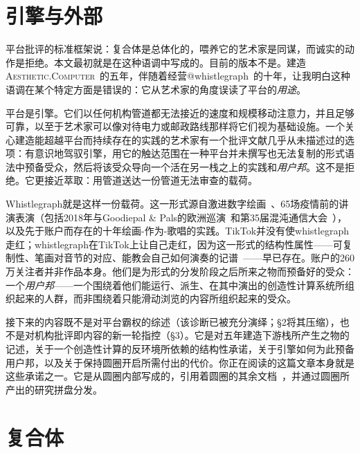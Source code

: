\documentclass[10pt,letterpaper,twocolumn]{article}
\newcommand{\ac}{\textsc{Aesthetic.Computer}}
\begin{document}
\section{引擎与外部}

平台批评的标准框架说：复合体是总体化的，喂养它的艺术家是同谋，而诚实的动作是拒绝。本文最初就是在这种语调中写成的。目前的版本不是。建造\ac{}~\citep{scudder2026ac}的五年，伴随着经营@whistlegraph~\citep{scudder2026whistlegraph}的十年，让我明白这种语调在某个特定方面是错误的：它从艺术家的角度误读了平台的\emph{用途}。

平台是引擎。它们以任何机构管道都无法接近的速度和规模移动注意力，并且足够可靠，以至于艺术家可以像对待电力或邮政路线那样将它们视为基础设施。一个关心建造能超越平台而持续存在的实践的艺术家有一个批评文献几乎从未描述过的选项：有意识地驾驭引擎，用它的触达范围在一种平台并未撰写也无法复制的形式语法中预备受众，然后将该受众导向一个活在另一栈之上的实践和\emph{用户邦}。这不是拒绝。它更接近萃取：用管道送达一份管道无法审查的载荷。

Whistlegraph就是这样一份载荷。这一形式源自激进数字绘画~\citep{scudder2026whistlegraph, scudder2017manifesto}、65场疫情前的讲演表演（包括2018年与Goodiepal \& Pals的欧洲巡演~\citep{scudder2026goodiepal}和第35届混沌通信大会~\citep{scudder2018rdp35c3}），以及先于账户而存在的十年绘画-作为-歌唱的实践。TikTok并没有使whistlegraph走红；whistlegraph在TikTok上让自己走红，因为这一形式的结构性属性——可复制性、笔画对音节的对应、能教会自己如何演奏的记谱~\citep{scudder2026whistlegraph}——早已存在。账户的260万关注者并非作品本身。他们是为形式的分发阶段之后所来之物而预备好的受众：一个\emph{用户邦}——一个围绕着他们能运行、派生、在其中演出的创造性计算系统所组织起来的人群，而非围绕着只能滑动浏览的内容所组织起来的受众。

接下来的内容既不是对平台霸权的综述（该诊断已被充分演绎；\S2将其压缩），也不是对机构批评即内容的新一轮指控（\S3）。它是对五年建造下游栈所产生之物的记述，关于一个创造性计算的反环境所依赖的结构性承诺，关于引擎如何为此预备用户邦，以及关于保持圆圈开启所需付出的代价。你正在阅读的这篇文章本身就是这些承诺之一。它是从圆圈内部写成的，引用着圆圈的其余文档~\citep{scudder2026ac, scudder2026kidlisp, scudder2026notepat, scudder2026os, scudder2026pieces, scudder2026urltradition, scudder2026archaeology, scudder2026whistlegraph, scudder2026goodiepal}，并通过圆圈所产出的研究拼盘分发。

\section{复合体}
\end{document}
